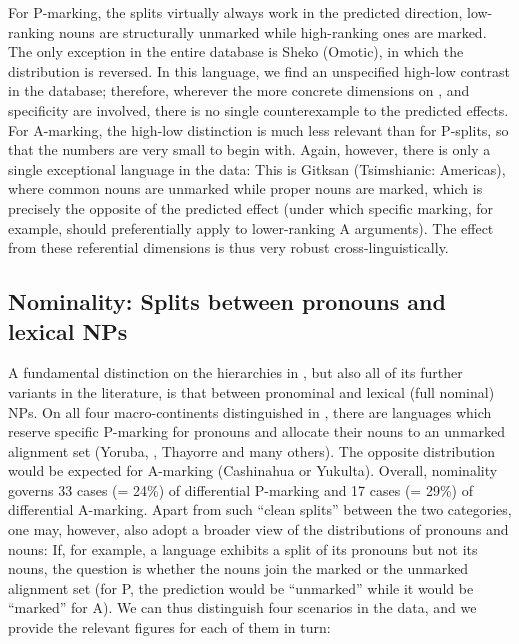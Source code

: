 \documentclass[output=paper]{langscibook}
\begin{document}
\newpage 
For P-marking, the splits virtually always work in the predicted direction, \ie low-ranking nouns are structurally unmarked while high-ranking ones are marked. The only exception in the entire database is Sheko (Omotic), in which the distribution is reversed. In this language, we find an unspecified high-low contrast in the database; therefore, wherever the more concrete dimensions on ,  and specificity are involved, there is no single counterexample to the predicted effects. For A-marking, the high-low distinction is much less relevant than for P-splits, so that the numbers are very small to begin with. Again, however, there is only a single exceptional language in the data: This is Gitksan (Tsimshianic: Americas), where common nouns are unmarked while proper nouns are marked, which is precisely the opposite of the predicted effect (under which specific marking, for example, should preferentially apply to lower-ranking A arguments). The effect from these referential dimensions is thus very robust cross-linguistically.

\subsection{Nominality: Splits between pronouns and lexical NPs}
\label{18-sc-subsec:2-4}

A fundamental distinction on the hierarchies in , but also all of its further variants in the literature, is that between pronominal and lexical (\ie full nominal) NPs. On all four macro-continents distinguished in , there are languages which reserve specific P-marking for pronouns and allocate their nouns to an unmarked alignment set (\eg Yoruba, , Thayorre and many others). The opposite distribution would be expected for A-marking (\eg Cashinahua or Yukulta). Overall, nominality governs 33 cases (= 24\%) of differential P-marking and 17 cases (= 29\%) of differential A-marking. Apart from such “clean splits” between the two categories, one may, however, also adopt a broader view of the  distributions of pronouns and nouns: If, for example, a language exhibits a split of its pronouns but not its nouns, the question is whether the nouns join the marked or the unmarked alignment set (for P, the prediction would be “unmarked” while it would be “marked” for A). We can thus distinguish four scenarios in the data, and we provide the relevant figures for each of them in turn:
\end{document}

